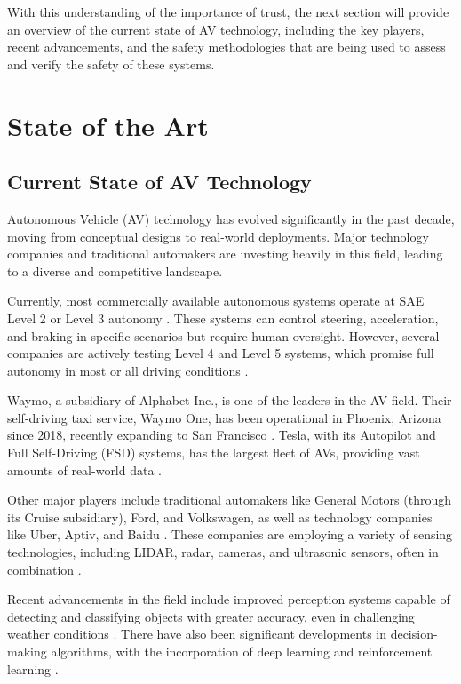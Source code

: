 With this understanding of the importance of trust, the next section will provide an overview of the current state of AV technology, including the key players, recent advancements, and the safety methodologies that are being used to assess and verify the safety of these systems.

\section{State of the Art}

\subsection{Current State of AV Technology}

Autonomous Vehicle (AV) technology has evolved significantly in the past decade, moving from conceptual designs to real-world deployments. Major technology companies and traditional automakers are investing heavily in this field, leading to a diverse and competitive landscape.

Currently, most commercially available autonomous systems operate at SAE Level 2 or Level 3 autonomy \cite{SAE2021}. %
These systems can control steering, acceleration, and braking in specific scenarios but require human oversight. However, several companies are actively testing Level 4 and Level 5 systems, which promise full autonomy in most or all driving conditions \cite{Yurtsever2020}.

Waymo, a subsidiary of Alphabet Inc., is one of the leaders in the AV field. Their self-driving taxi service, Waymo One, has been operational in Phoenix, Arizona since 2018, recently expanding to San Francisco \cite{Waymo2023}. Tesla, with its Autopilot and Full Self-Driving (FSD) systems, has the largest fleet of AVs, providing vast amounts of real-world data \cite{Tesla2023}.

Other major players include traditional automakers like General Motors (through its Cruise subsidiary), Ford, and Volkswagen, as well as technology companies like Uber, Aptiv, and Baidu \cite{Koopman2019}. These companies are employing a variety of sensing technologies, including LIDAR, radar, cameras, and ultrasonic sensors, often in combination \cite{Yurtsever2020}.

Recent advancements in the field include improved perception systems capable of detecting and classifying objects with greater accuracy, even in challenging weather conditions \cite{Grigorescu2020}. There have also been significant developments in decision-making algorithms, with the incorporation of deep learning and reinforcement learning \cite{Kiran2021}.

